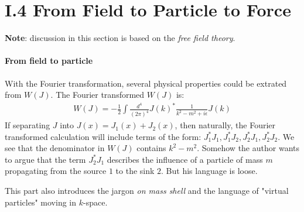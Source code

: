 \documentclass{book}
\numberwithin{equation}{subsection} %
\theoremstyle{definition}
\begin{document}
\section{I.4 From Field to Particle to Force}
\label{sec:I.4 From Field to Particle to Force}

\textbf{Note}: discussion in this section is based on the \textit{free
field theory}.

\paragraph{From field to particle}

With the Fourier transformation, several physical properties
could be extrated from $W(J)$. The Fourier transformed $W(J)$ is:
\begin{align}
    W(J) = -\frac{1}{2}\int \frac{d^4}{(2\pi)^4}J(k)^*
        \frac{1}{k^2-m^2+i\epsilon}J(k)
\end{align}
If separating $J$ into $J(x)=J_1(x)+J_2(x)$, then naturally, the
Fourier transformed calculation will include terms of the form:
$J^*_1J_1,J^*_1J_2,J^*_2J_1,J^*_2J_2$. We see that the denominator
in $W(J)$ contains $k^2-m^2$. Somehow the author wants to argue that
the term $J^*_2J_1$ describes the influence of a particle of mass $m$
propagating from the source $1$ to the sink $2$. But his language is loose.

This part also introduces the jargon \textit{on mass shell} and the
language of "virtual particles" moving in $k$-space.
\end{document}
